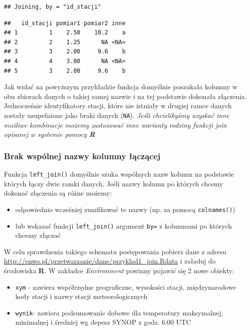 \documentclass[]{book}
\providecommand{\tightlist}{%
  \setlength{\itemsep}{0pt}\setlength{\parskip}{0pt}}
\theoremstyle{definition}
\theoremstyle{definition}
\theoremstyle{definition}
\theoremstyle{remark}
\begin{document}
\begin{verbatim}
## Joining, by = "id_stacji"
\end{verbatim}

\begin{verbatim}
##   id_stacji pomiar1 pomiar2 inne
## 1         1    2.50    10.2    a
## 2         2    1.25      NA <NA>
## 3         3    2.00     9.6    b
## 4         4    3.00      NA <NA>
## 5         3    2.00     9.6    b
\end{verbatim}

Jak widać na powyższym przykładzie funkcja domyślnie poszukała kolumny w
obu zbiorach danych o takiej samej nazwie i na tej podstawie dokonała
złączenia. Jednocześnie identyfikatory stacji, które nie istniały w
drugiej ramce danych zostały uzupełnione jako braki danych
(\texttt{NA}). \emph{Jeśli chcielibyśmy uzyskać inne możliwe kombinacje
możemy zastosować inne warianty rodziny funkcji join opisanej w systemie
pomocy \textbf{R} }

\subsubsection*{Brak wspólnej nazwy kolumny
łączącej}\label{brak-wspolnej-nazwy-kolumny-aczacej}

Funkcja \texttt{left\_join()} domyślnie szuka wspólnych nazw kolumn na
podstawie których łączy dwie ramki danych. Jeśli nazwy kolumn po których
chcemy dokonać złączenia są różne możemy:

\begin{itemize}
\tightlist
\item
  odpowiednio wcześniej zunifikować te nazwy (np. za pomocą
  \texttt{colnames()})
\item
  lub wskazać funkcji \texttt{left\_join()} argument \texttt{by=} z
  kolumnami po których chcemy złączać
\end{itemize}

W celu sprawdzenia takiego schematu postępowania pobierz dane z adresu
\url{http://enwo.pl/przetwarzanie/dane/przyklad1_join.Rdata} i załaduj
do środowiska \textbf{R}. W zakładce \emph{Environment} powinny pojawić
się 2 nowe obiekty:

\begin{itemize}
\tightlist
\item
  \texttt{xym} - zawiera współrzędne geograficzne, wysokości stacji,
  międzynarodowe kody stacji i nazwy stacji meteorologicznych
\item
  \texttt{wynik}- zawiera podsumowanie dobowe dla temperatury
  maksymalnej, minimalnej i średniej wg depesz SYNOP z godz. 6:00 UTC
\end{itemize}
\end{document}
